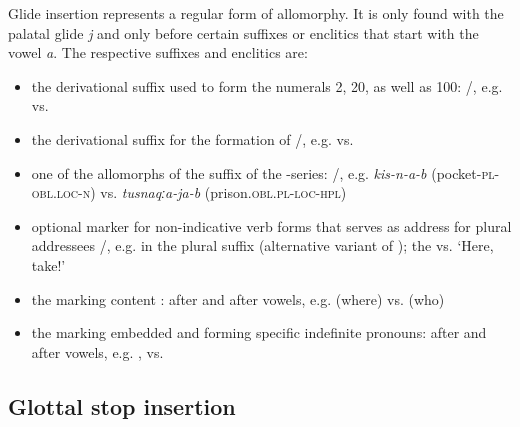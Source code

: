 Glide insertion represents a regular form of allomorphy. It is only found with the palatal glide \textit{j} and only before certain suffixes or enclitics that start with the vowel \textit{a}. The respective suffixes and enclitics are:
%
\begin{itemize}
	\item	the derivational suffix used to form the numerals 2, 20, as well as 100: \slash{}, e.g.   vs.   
	\item	the derivational suffix  for the formation of  \slash{}, e.g.   vs.  
	\item	one of the allomorphs of the  suffix of the -series: \slash{}, e.g. \textit{kis-n-a-b}  (pocket-\textsc{pl}-\textsc{obl}.\textsc{loc}-\textsc{n}) vs. \textit{tusnaqːa-ja-b}  (prison.\textsc{obl.pl-loc-hpl}) 
	\item	optional marker for non-indicative verb forms that  serves as address  for plural addressees \slash{}, e.g. in the  plural suffix  (alternative variant of ); the   vs.  `Here, take!'
	\item	the  marking content :  after  and  after vowels, e.g.   (where) vs.   (who)
	\item	the  marking embedded  and forming specific indefinite pronouns:  after  and  after vowels, e.g.  , 	 vs.   
\end{itemize}



\subsection{Glottal stop insertion}
\label{ssec:Glottal stop insertion}

